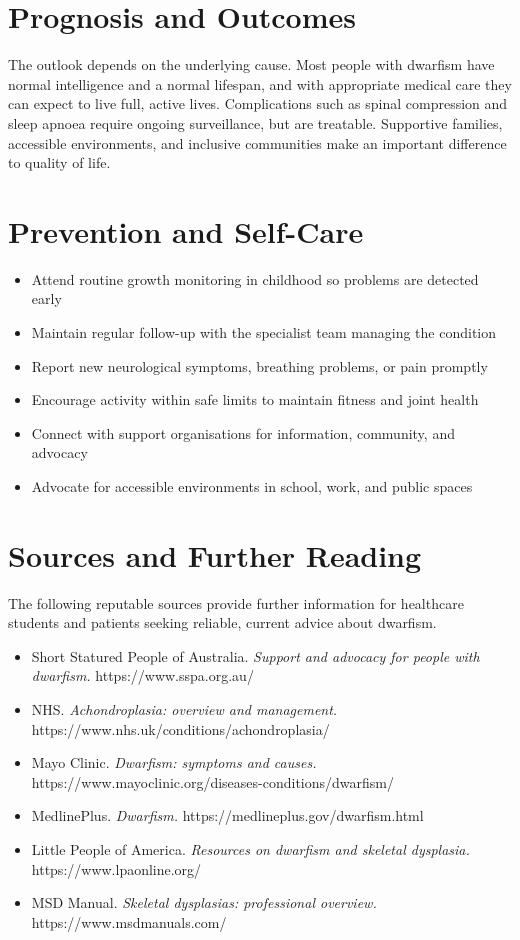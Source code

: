 \section*{Prognosis and Outcomes}
The outlook depends on the underlying cause. Most people with dwarfism have normal intelligence and a normal lifespan, and with appropriate medical care they can expect to live full, active lives. Complications such as spinal compression and sleep apnoea require ongoing surveillance, but are treatable. Supportive families, accessible environments, and inclusive communities make an important difference to quality of life.

\section*{Prevention and Self-Care}
\begin{itemize}
    \item Attend routine growth monitoring in childhood so problems are detected early
    \item Maintain regular follow-up with the specialist team managing the condition
    \item Report new neurological symptoms, breathing problems, or pain promptly
    \item Encourage activity within safe limits to maintain fitness and joint health
    \item Connect with support organisations for information, community, and advocacy
    \item Advocate for accessible environments in school, work, and public spaces
\end{itemize}

\section*{Sources and Further Reading}
The following reputable sources provide further information for healthcare students and patients seeking reliable, current advice about dwarfism.
\begin{itemize}
    \item Short Statured People of Australia. \textit{Support and advocacy for people with dwarfism.} https://www.sspa.org.au/
    \item NHS. \textit{Achondroplasia: overview and management.} https://www.nhs.uk/conditions/achondroplasia/
    \item Mayo Clinic. \textit{Dwarfism: symptoms and causes.} https://www.mayoclinic.org/diseases-conditions/dwarfism/
    \item MedlinePlus. \textit{Dwarfism.} https://medlineplus.gov/dwarfism.html
    \item Little People of America. \textit{Resources on dwarfism and skeletal dysplasia.} https://www.lpaonline.org/
    \item MSD Manual. \textit{Skeletal dysplasias: professional overview.} https://www.msdmanuals.com/
\end{itemize}
